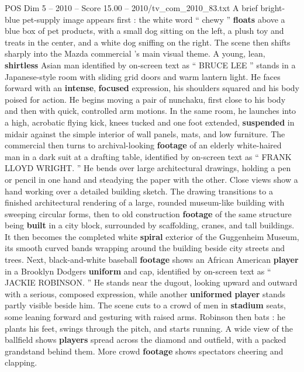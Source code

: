 \begin{textsample}{POS Dim 5 – 2010 – Score 15.00 – 2010/tv\_com\_2010\_83.txt}  \label{ex:f5_pos_042}
A brief bright-blue pet-supply image appears first : the white word “ chewy ” \textbf{floats} above a blue box of pet products, with a small dog sitting on the left, a plush toy and treats in the center, and a white dog sniffing on the right.
The scene then shifts sharply into the Mazda commercial ’s main visual theme.
A young, lean, \textbf{shirtless} Asian man identified by on-screen text as “ BRUCE LEE ” stands in a Japanese-style room with sliding grid doors and warm lantern light.
He faces forward with an \textbf{intense}, \textbf{focused} expression, his shoulders squared and his body poised for action.
He begins moving a pair of nunchaku, first close to his body and then with quick, controlled arm motions.
In the same room, he launches into a high, acrobatic flying kick, knees tucked and one foot extended, \textbf{suspended} in midair against the simple interior of wall panels, mats, and low furniture.
The commercial then turns to archival-looking \textbf{footage} of an elderly white-haired man in a dark suit at a drafting table, identified by on-screen text as “ FRANK LLOYD WRIGHT. ” He bends over large architectural drawings, holding a pen or pencil in one hand and steadying the paper with the other.
Close views show a hand working over a detailed building sketch.
The drawing transitions to a finished architectural rendering of a large, rounded museum-like building with sweeping circular forms, then to old construction \textbf{footage} of the same structure being \textbf{built} in a city block, surrounded by scaffolding, cranes, and tall buildings.
It then becomes the completed white \textbf{spiral} exterior of the Guggenheim Museum, its smooth curved bands wrapping around the building beside city streets and trees.
Next, black-and-white baseball \textbf{footage} shows an African American \textbf{player} in a Brooklyn Dodgers \textbf{uniform} and cap, identified by on-screen text as “ JACKIE ROBINSON. ” He stands near the dugout, looking upward and outward with a serious, composed expression, while another \textbf{uniformed} \textbf{player} stands partly visible beside him.
The scene cuts to a crowd of men in \textbf{stadium} seats, some leaning forward and gesturing with raised arms.
Robinson then bats : he plants his feet, swings through the pitch, and starts running.
A wide view of the ballfield shows \textbf{players} spread across the diamond and outfield, with a packed grandstand behind them.
More crowd \textbf{footage} shows spectators cheering and clapping.

\end{textsample}
